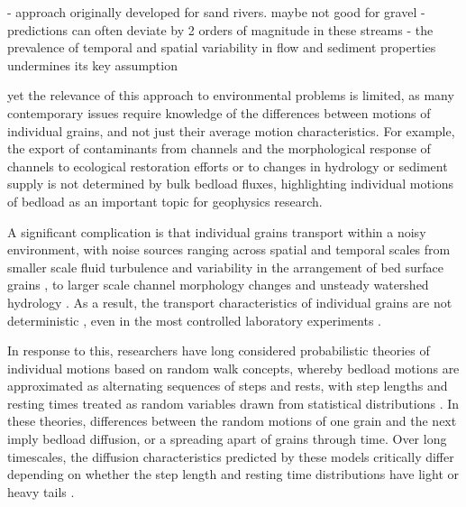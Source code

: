\documentclass[draft]{agujournal2018}
\begin{document}
- approach originally developed for sand rivers. maybe not good for gravel
- predictions can often deviate by 2 orders of magnitude in these streams
- the prevalence of temporal and spatial variability in flow and sediment properties undermines its key assumption






 yet the relevance of this approach to environmental problems is limited, as many contemporary issues require knowledge of the differences between motions of individual grains, and not just their average motion characteristics.
For example, the export of contaminants from channels \citep[e.g.][]{Malmon2005} and the morphological response of channels to ecological restoration efforts \citep[e.g.][]{Gaeuman2017} or to changes in hydrology or sediment supply \citep[e.g.][]{Hassan2017} is not determined by bulk bedload fluxes, highlighting individual motions of bedload as an important topic for geophysics research.

A significant complication is that individual grains transport within a noisy environment, with noise sources ranging across spatial and temporal scales from smaller scale fluid turbulence \citep{Celik2014} and variability in the arrangement of bed surface grains \citep{Gordon1972}, to larger scale channel morphology changes \citep{Hassan2017} and unsteady watershed hydrology \citep{}.
As a result, the transport characteristics of individual grains are not deterministic \citep[e.g.][]{Einstein1937}, even in the most controlled laboratory experiments \citep[e.g.][]{Charru2004, Bohm2004, Fathel2015, Heyman2016}.

In response to this, researchers have long considered probabilistic theories of individual motions based on random walk concepts, whereby bedload motions are approximated as alternating sequences of steps and rests, with step lengths and resting times treated as random variables drawn from statistical distributions \citep{Einstein1937, Yano1969, Nakagawa1976, Hassan1991, Bradley2012}.
In these theories, differences between the random motions of one grain and the next imply bedload diffusion, or a spreading apart of grains through time.
Over long timescales, the diffusion characteristics predicted by these models critically differ depending on whether the step length and resting time distributions have light or heavy tails \citep[e.g.][]{Bradley2017}.
\end{document}
